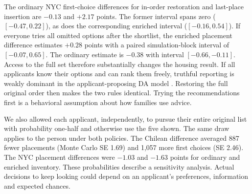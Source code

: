 The ordinary NYC first-choice differences for in-order restoration and last-place insertion are $-0.13$ and $+2.17$ points. The former interval spans zero ($[-0.47,0.22]$), as does the corresponding enriched interval ($[-0.16,0.54]$). If everyone tries all omitted options after the shortlist, the enriched placement difference estimates $+0.28$ points with a paired simulation-block interval of $[-0.07,0.65]$. The ordinary estimate is $-0.38$ with interval $[-0.66,-0.11]$. Access to the full set therefore substantially changes the housing result. If all applicants know their options and can rank them freely, truthful reporting is weakly dominant in the applicant-proposing DA model \citep{dubinsfreedman}. Restoring the full original order then makes the two rules identical. Trying the recommendations first is a behavioral assumption about how families use advice.

We also allowed each applicant, independently, to pursue their entire original list with probability one-half and otherwise use the five shown. The same draw applies to the person under both policies. The Chilean difference averaged 887 fewer placements (Monte Carlo SE 1.69) and 1,057 more first choices (SE 2.46). The NYC placement differences were $-1.03$ and $-1.63$ points for ordinary and enriched inventory. These probabilities describe a sensitivity analysis. Actual decisions to keep looking could depend on an applicant's preferences, information and expected chances.
